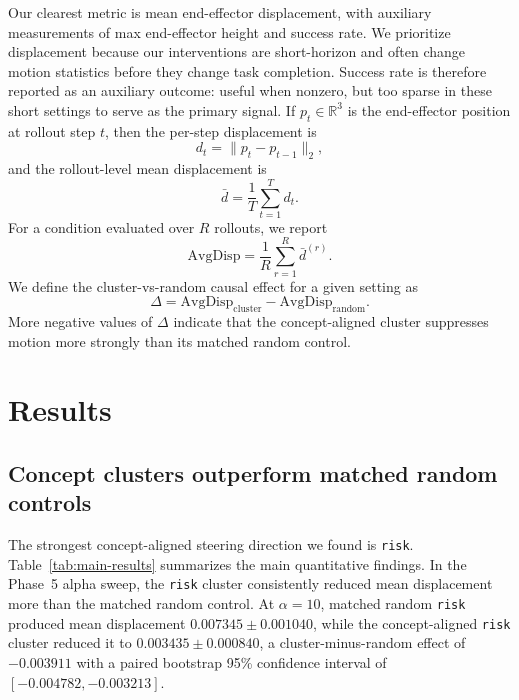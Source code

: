\documentclass[11pt]{article}
\begin{document}
Our clearest metric is mean end-effector displacement, with auxiliary measurements of max end-effector height and success rate. We prioritize displacement because our interventions are short-horizon and often change motion statistics before they change task completion. Success rate is therefore reported as an auxiliary outcome: useful when nonzero, but too sparse in these short settings to serve as the primary signal. If $p_t \in \mathbb{R}^{3}$ is the end-effector position at rollout step $t$, then the per-step displacement is
\begin{equation}
d_t = \|p_t - p_{t-1}\|_2,
\end{equation}
and the rollout-level mean displacement is
\begin{equation}
\bar{d} = \frac{1}{T}\sum_{t=1}^{T} d_t.
\label{eq:mean-displacement}
\end{equation}
For a condition evaluated over $R$ rollouts, we report
\begin{equation}
\mathrm{AvgDisp} = \frac{1}{R}\sum_{r=1}^{R}\bar{d}^{(r)}.
\end{equation}
We define the cluster-vs-random causal effect for a given setting as
\begin{equation}
\Delta = \mathrm{AvgDisp}_{\text{cluster}} - \mathrm{AvgDisp}_{\text{random}}.
\label{eq:cluster-effect}
\end{equation}
More negative values of $\Delta$ indicate that the concept-aligned cluster suppresses motion more strongly than its matched random control.

\section{Results}

\subsection{Concept clusters outperform matched random controls}

The strongest concept-aligned steering direction we found is \texttt{risk}. Table~\ref{tab:main-results} summarizes the main quantitative findings. In the Phase~5 alpha sweep, the \texttt{risk} cluster consistently reduced mean displacement more than the matched random control. At $\alpha=10$, matched random \texttt{risk} produced mean displacement $0.007345 \pm 0.001040$, while the concept-aligned \texttt{risk} cluster reduced it to $0.003435 \pm 0.000840$, a cluster-minus-random effect of $-0.003911$ with a paired bootstrap 95\% confidence interval of $[-0.004782,-0.003213]$.
\end{document}
